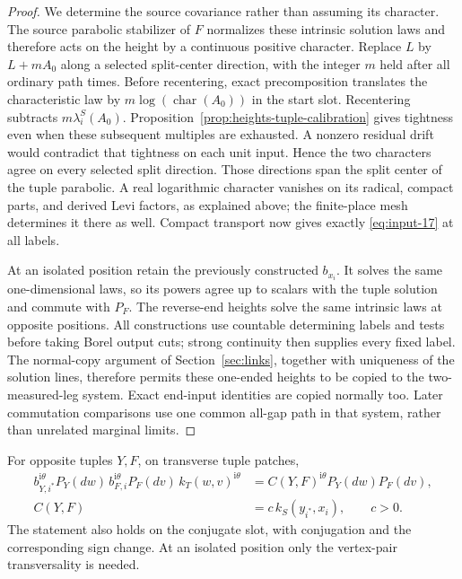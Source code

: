 \begin{proof}
We determine the source covariance rather than assuming its character.
The source parabolic stabilizer of $F$ normalizes these intrinsic solution
laws and therefore acts on the height by a continuous positive character.
Replace $L$ by $L+mA_0$ along a selected split-center direction, with the
integer $m$ held after all ordinary path times.  Before recentering,
exact precomposition translates the characteristic law by
$m\log(\operatorname{char}(A_0))$ in the start slot.  Recentering subtracts
$m\lambda_i^S(A_0)$.  Proposition~\ref{prop:heights-tuple-calibration}
gives tightness even when these subsequent multiples are exhausted.
A nonzero residual drift would contradict that tightness on each unit
input.  Hence the two characters agree on every selected split direction.
Those directions span the split center of the tuple parabolic.  A real
logarithmic character vanishes on its radical, compact parts, and derived
Levi factors, as explained above; the finite-place mesh determines it
there as well.  Compact transport now gives exactly
\eqref{eq:input-17} at all labels.

At an isolated position retain the previously constructed $b_{x_i}$.
It solves the same one-dimensional laws, so its powers agree up to scalars
with the tuple solution and commute with $P_F$.  The reverse-end heights
solve the same intrinsic laws at opposite positions.  All constructions
use countable determining labels and tests before taking Borel output
cuts; strong continuity then supplies every fixed label.  The normal-copy
argument of Section~\ref{sec:links}, together with uniqueness of the
solution lines, therefore permits these one-ended heights to be copied
to the two-measured-leg system.  Exact end-input identities are copied
normally too.  Later commutation comparisons use one common all-gap path
in that system, rather than unrelated marginal limits.
\end{proof}

\begin{proposition}\label{prop:heights-pair-law}
For opposite tuples $Y,F$, on transverse tuple patches,
\begin{equation}\label{eq:input-19}
 \begin{split}
 b_{Y,i^*}^{\mathrm i\theta}P_Y(dw)\,
 b_{F,i}^{\mathrm i\theta}P_F(dv)\,
 k_T(w,v)^{\mathrm i\theta}
 &=C(Y,F)^{\mathrm i\theta}P_Y(dw)P_F(dv),\\
 C(Y,F)&=c\,k_S(y_{i^*},x_i),\qquad c>0.
 \end{split}
\end{equation}
The statement also holds on the conjugate slot, with conjugation and the
corresponding sign change.  At an isolated position only the vertex-pair
transversality is needed.
\end{proposition}

